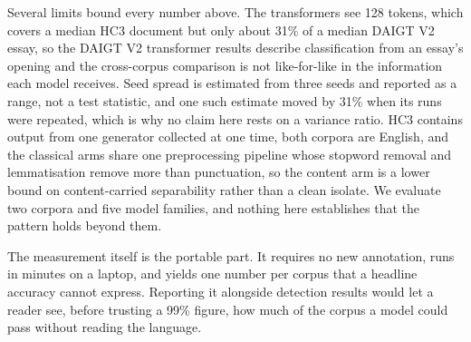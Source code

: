 Several limits bound every number above. The transformers see 128 tokens, which covers a median HC3 document but only about 31\% of a median DAIGT V2 essay, so the DAIGT V2 transformer results describe classification from an essay's opening and the cross-corpus comparison is not like-for-like in the information each model receives. Seed spread is estimated from three seeds and reported as a range, not a test statistic, and one such estimate moved by 31\% when its runs were repeated, which is why no claim here rests on a variance ratio. HC3 contains output from one generator collected at one time, both corpora are English, and the classical arms share one preprocessing pipeline whose stopword removal and lemmatisation remove more than punctuation, so the content arm is a lower bound on content-carried separability rather than a clean isolate. We evaluate two corpora and five model families, and nothing here establishes that the pattern holds beyond them.

The measurement itself is the portable part. It requires no new annotation, runs in minutes on a laptop, and yields one number per corpus that a headline accuracy cannot express. Reporting it alongside detection results would let a reader see, before trusting a 99\% figure, how much of the corpus a model could pass without reading the language.
